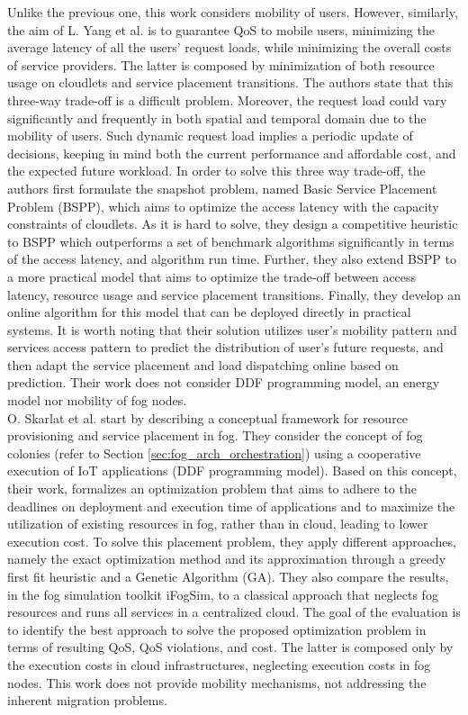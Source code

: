 \noindent\tab Unlike the previous one, this work considers mobility of users. However, similarly, the aim of L. Yang et al. \cite{yang2016cost} is to guarantee QoS to mobile users, minimizing the average latency of all the users’ request loads, while minimizing the overall costs of service providers. The latter is composed by minimization of both resource usage on cloudlets and service placement transitions. The authors state that this three-way trade-off is a difficult problem. Moreover, the request load could vary significantly and frequently in both spatial and temporal domain due to the mobility of users. Such dynamic request load implies a periodic update of decisions, keeping in mind both the current performance and affordable cost, and the expected future workload. In order to solve this three way trade-off, the authors first formulate the snapshot problem, named Basic Service Placement Problem (BSPP), which aims to optimize the access latency with the capacity constraints of cloudlets. As it is hard to solve, they design a competitive heuristic to BSPP which outperforms a set of benchmark algorithms significantly in terms of the access latency, and algorithm run time. Further, they also extend BSPP to a more practical model that aims to optimize the trade-off between access latency, resource usage and service placement transitions. Finally, they develop an online algorithm for this model that can be deployed directly in practical systems. It is worth noting that their solution utilizes user’s mobility pattern and services access pattern to predict the distribution of user’s future requests, and then adapt the service placement and load dispatching online based on prediction. Their work does not consider DDF programming model, an energy model nor mobility of fog nodes.\\
\noindent\tab O. Skarlat et al. \cite{skarlat2017optimized} start by describing a conceptual framework for resource provisioning and service placement in fog. They consider the concept of fog colonies (refer to Section \ref{sec:fog_arch_orchestration}) using a cooperative execution of IoT applications (DDF programming model). Based on this concept, their work, formalizes an optimization problem that aims to adhere to the deadlines on deployment and execution time of applications and to maximize the utilization of existing resources in fog, rather than in cloud, leading to lower execution cost. To solve this placement problem, they apply different approaches, namely the exact optimization method and its approximation through a greedy first fit heuristic and a Genetic Algorithm (GA). They also compare the results, in the fog simulation toolkit iFogSim, to a classical approach that neglects fog resources and runs all services in a centralized cloud. The goal of the evaluation is to identify the best approach to solve the proposed optimization problem in terms of resulting QoS, QoS violations, and cost. The latter is composed only by the execution costs in cloud infrastructures, neglecting execution costs in fog nodes. This work does not provide mobility mechanisms, not addressing the inherent migration problems.\\
